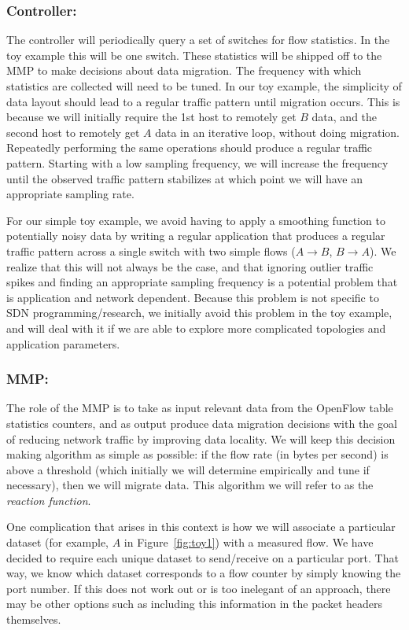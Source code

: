 \documentclass[12pt]{article} \usepackage{graphicx} \usepackage{amsmath}
\begin{document}
\subsubsection*{Controller:} \label{controller} The controller will periodically
query a set of switches for flow statistics. In the toy example this will be one
switch.  These statistics will be shipped off to the MMP to make decisions about
data migration.  The frequency with which statistics are collected will need to
be tuned.  In our toy example, the simplicity of data layout should lead to a
regular traffic pattern until migration occurs.  This is because we will
initially require the 1st host to remotely get $B$ data, and the second host to
remotely get $A$ data in an iterative loop, without doing migration.  Repeatedly
performing the same operations should produce a regular traffic pattern.
Starting with a low sampling frequency, we will increase the frequency until the
observed traffic pattern stabilizes at which point we will have an appropriate
sampling rate.

For our simple toy example, we avoid having to apply a smoothing function to
potentially noisy data by writing a regular application that produces a regular
traffic pattern across a single switch with two simple flows ($A\rightarrow B$,
$B\rightarrow A$).  We realize that this will not always be the case, and that
ignoring outlier traffic spikes and finding an appropriate sampling frequency is
a potential problem that is application and network dependent.  Because this
problem is not specific to SDN programming/research, we initially avoid this
problem in the toy example, and will deal with it if we are able to explore more complicated
topologies and application parameters. %


\subsubsection*{MMP:} \label{mmp} The role of the MMP is to take as input
relevant data from the OpenFlow table statistics counters, and as output produce
data migration decisions with the goal of reducing network traffic by improving
data locality.  We will keep this decision making algorithm as simple as
possible: if the flow rate (in bytes per second) is above a threshold (which
initially we will determine empirically and tune if necessary), then we will
migrate data.  This algorithm we will refer to as the \textit{reaction
function}.  

One complication that arises in this context is how we will associate a
particular dataset (for example, $A$ in Figure~\ref{fig:toy1}) with a measured
flow.  We have decided to require each unique dataset to send/receive on a
particular port.  That way, we know which dataset corresponds to a flow counter
by simply knowing the port number.  If this does not work out or is too
inelegant of an approach, there may be other options such as including this
information in the packet headers themselves. 
\end{document}
